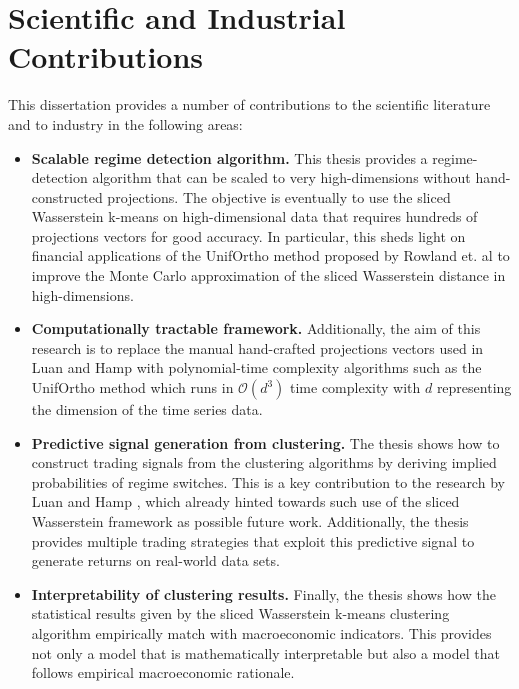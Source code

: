 \documentclass[12pt,a4paper]{report}
\begin{document}
\section{Scientific and Industrial Contributions}
This dissertation provides a number of contributions to the scientific literature and to industry in the following areas:

  \begin{itemize}
      \item \textbf{Scalable regime detection algorithm.} This thesis provides 
  a regime-detection algorithm that can be scaled to very high-dimensions without hand-constructed projections. 
  The objective is eventually to use the sliced Wasserstein k-means on high-dimensional data that requires hundreds of projections vectors for good accuracy. 
  In particular, this sheds light on financial applications of the UnifOrtho method proposed by Rowland et. al \cite{RowlandEtAl2019} to improve the Monte Carlo approximation of the sliced Wasserstein distance in high-dimensions.
  \item \textbf{Computationally tractable framework.}
  Additionally, the aim of this research is to replace the manual hand-crafted projections vectors used in Luan and Hamp \cite{LuanHamp2025} with polynomial-time complexity algorithms such as the UnifOrtho method which runs in $\mathcal{O}(d^3)$ time complexity with $d$ representing the dimension 
  of the time series data.
  
  \item \textbf{Predictive signal generation from clustering.} 
  The thesis shows how to construct trading signals from the clustering algorithms by deriving implied probabilities of regime switches. 
  This is a key contribution to the research by Luan and Hamp \cite{LuanHamp2025}, which already hinted towards such use of the sliced Wasserstein framework as possible future work.
  Additionally, the thesis provides multiple trading strategies that exploit this predictive signal to generate returns on real-world data sets.

  \item \textbf{Interpretability of clustering results.}
  Finally, the thesis shows how the statistical results given by the sliced Wasserstein k-means clustering algorithm empirically match with macroeconomic indicators.
  This provides not only a model that is mathematically interpretable but also a model that follows empirical macroeconomic rationale.
\end{itemize}
\end{document}

